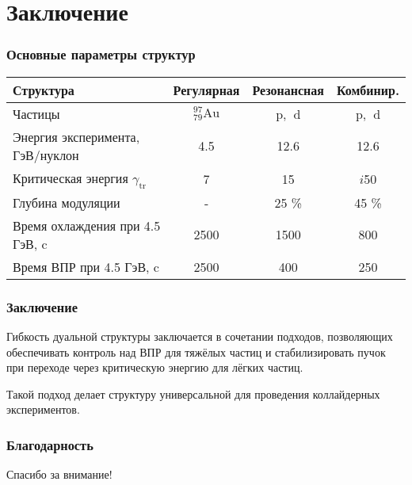 \section{Заключение}

\begin{frame}
	\frametitle{Основные параметры структур}

\begin{table}
\begin{center}
\begin{tabular}{|l|c|c|c|} 
\hline
Структура & Регулярная & Резонансная & Комбинир. \\
\hline Частицы & ${ }_{79}^{97} \mathrm{Au}$ & $\mathrm{p}$, $\mathrm{~d}$ & $\mathrm{p}$, $\mathrm{~d}$ \\
\hline Энергия эксперимента, ГэВ/нуклон & 4.5 & 12.6 & 12.6 \\
\hline Критическая энергия $\gamma_{\mathrm{tr}}$  & 7 & 15 & $i$50 \\
\hline Глубина модуляции & - & 25 \% & 45 \% \\
\hline Время охлаждения при 4.5 ГэВ, c & 2500 & 1500 & 800 \\
\hline Время ВПР при 4.5 ГэВ, c & 2500 & 400 & 250 \\
\hline
\end{tabular}
\end{center}
\label{tab:dual}
\end{table}

\end{frame}

\begin{frame}
	\frametitle{Заключение}
	
\par Гибкость дуальной структуры заключается в сочетании подходов, позволяющих обеспечивать контроль над ВПР для тяжёлых частиц и стабилизировать пучок при переходе через критическую энергию для лёгких частиц. 
\newline
\par Такой подход делает структуру универсальной для проведения коллайдерных экспериментов.
	
\end{frame}

\begin{frame}
	\frametitle{Благодарность}
	\begin{center}
		Спасибо за внимание!
	\end{center}
	
\end{frame}
